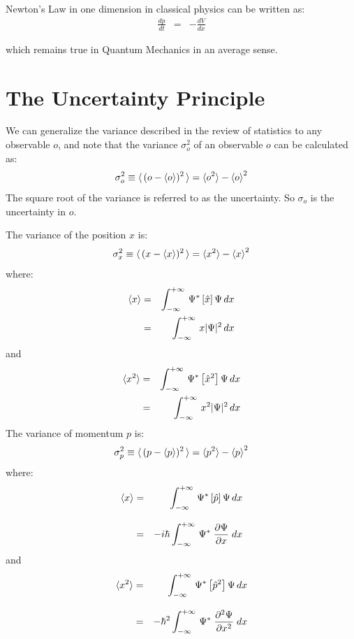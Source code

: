 \documentclass[12pt]{book}
\begin{document}
Newton's Law in one dimension in classical physics can be written as:
\begin{eqnarray}
\label{eqn:ehrenfest}
\frac{dp}{dt} &=& -\frac{dV}{dx}
\end{eqnarray}

which remains true in Quantum Mechanics in an average sense.

\section{The Uncertainty Principle}

We can generalize the variance described in the review of statistics to any observable $o$, and note that the variance $\sigma^2_o$ of an observable $o$ can be calculated as:
\begin{displaymath}
\sigma_o^2 \equiv \braket{\,(o-\braket{o})^2\,} = \braket{o^2}-\braket{o}^2
\end{displaymath}
The square root of the variance is referred to as the uncertainty.  So $\sigma_o$ is the uncertainty in $o$.

The variance of the position $x$ is:
\begin{displaymath}
\sigma_x^2 \equiv \braket{\,(x-\braket{x})^2\,} = \braket{x^2}-\braket{x}^2
\end{displaymath}
where:
\begin{eqnarray}
\braket{x} 
 &=& \int_{-\infty}^{+\infty} \, \Psi^* \left[ \hat{x} \right] \Psi \,dx \\
 &=& \int_{-\infty}^{+\infty} \, x|\Psi|^2 \,dx 
\end{eqnarray}
and
\begin{eqnarray}
\braket{x^2} 
 &=& \int_{-\infty}^{+\infty} \, \Psi^* \left[ \hat{x}^2 \right] \Psi \,dx \\
 &=& \int_{-\infty}^{+\infty} \, x^2|\Psi|^2 \,dx 
\end{eqnarray}
The variance of momentum $p$ is:
\begin{displaymath}
\sigma_p^2 \equiv \braket{\,(p-\braket{p})^2\,} = \braket{p^2}-\braket{p}^2
\end{displaymath}
where:
\begin{eqnarray}
\braket{x} 
 &=& \int_{-\infty}^{+\infty} \, \Psi^* \left[ \hat{p} \right] \Psi \,dx \\[8pt]
 &=& -i \hbar \int_{-\infty}^{+\infty} \, \Psi^* \;  \frac{\partial \Psi}{\partial x}  \; dx \\
\end{eqnarray}
and
\begin{eqnarray}
\braket{x^2} 
 &=& \int_{-\infty}^{+\infty} \, \Psi^* \left[ \hat{p}^2 \right] \Psi \,dx \\[8pt]
 &=& -\hbar^2 \int_{-\infty}^{+\infty} \, \Psi^* \;  \frac{\partial^2 \Psi}{\partial x^2}  \; dx \\
\end{eqnarray}
\end{document}
